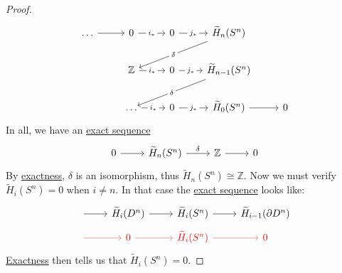 \begin{proof}
	\[
		\begin{tikzcd}
			\dots & {0} & {0} & {\widetilde{H}_n(S^n)} \\
			& {\mathbb{Z} } & {0} & {\widetilde{H}_{n-1}(S^n)} \\
			& \dots & {0} & {\widetilde{H}_{0}(S^n)} & 0
			\arrow["{j_\ast}"{description}, from=1-3, to=1-4]
			\arrow["{j_\ast}"{description}, from=2-3, to=2-4]
			\arrow[from=3-4, to=3-5]
			\arrow["{i_\ast}"{description}, from=2-2, to=2-3]
			\arrow["{i_\ast}"{description}, from=1-2, to=1-3]
			\arrow[from=1-1, to=1-2]
			\arrow["\delta"{description}, from=1-4, to=2-2]
			\arrow["\delta"{description}, from=2-4, to=3-2]
			\arrow["{j_\ast}"{description}, from=3-3, to=3-4]
			\arrow["{i_\ast}"{description}, from=3-2, to=3-3]
		\end{tikzcd}
	\]
	In all, we have an \hyperref[def:exact-sequence]{exact sequence}
	\[
		\begin{tikzcd}
			0 & {\widetilde{H}_n(S^n)} & {\mathbb{Z}} & 0
			\arrow["\delta", from=1-2, to=1-3]
			\arrow[from=1-3, to=1-4]
			\arrow[from=1-1, to=1-2]
		\end{tikzcd}
	\]
	By \hyperref[def:exact]{exactness}, \(\delta\) is an isomorphism, thus \(\widetilde{H}_n(S^n) \cong \mathbb{Z}\). Now we must verify \(\widetilde{H}_i(S^n) = 0\)
	when \(i\neq n\). In that case the \hyperref[def:exact-sequence]{exact sequence} looks like:
	\[
		\begin{tikzcd}[row sep=tiny]
			{} & {\widetilde{H}_i(D^n)} & {\widetilde{H}_i(S^n)} & {\widetilde{H}_{i-1}(\partial D^n)} \\
			{} & \color{red}0 & \color{red}{\widetilde{H}_i(S^n)} & \color{red}0
			\arrow[from=1-2, to=1-3]
			\arrow[from=1-3, to=1-4]
			\arrow[from=1-1, to=1-2]
			\arrow[color={rgb,255:red,214;green,92;blue,92}, from=2-1, to=2-2]
			\arrow[color={rgb,255:red,214;green,92;blue,92}, from=2-2, to=2-3]
			\arrow[color={rgb,255:red,214;green,92;blue,92}, from=2-3, to=2-4]
		\end{tikzcd}
	\]
	\hyperref[def:exact]{Exactness} then tells us that \(\widetilde{H}_i(S^n) = 0\).
\end{proof}


